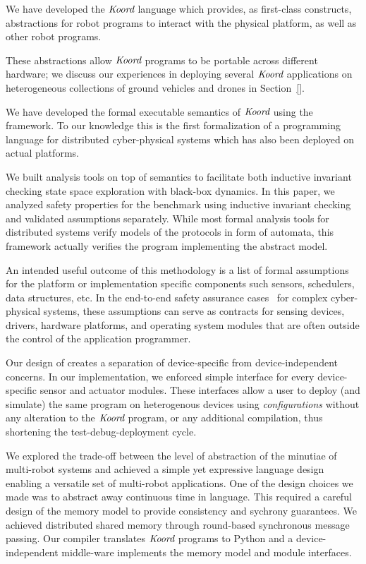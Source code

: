 \begin{noinditem}

\item  {We have developed the $\emph{Koord}$ language which provides, as first-class constructs,  abstractions for robot  programs to interact with the physical platform, as well as other robot programs.}
\item These abstractions allow $\emph{Koord}$ programs to be portable across different hardware; we  discuss our experiences in deploying several $\emph{Koord}$ applications on heterogeneous collections of ground vehicles and drones in Section~\ref{}.
\item  We have developed the formal executable semantics of $\emph{Koord}$ using the \K framework. To our knowledge this is the first formalization of a programming language for distributed cyber-physical systems which has also been deployed on actual platforms.
\item  We built analysis tools on top of semantics to facilitate both inductive invariant checking state space exploration with black-box dynamics. In this paper, we analyzed safety properties for the benchmark using inductive invariant checking and validated assumptions separately. While most formal analysis tools for distributed systems verify models of the protocols in form of automata, this framework actually verifies the program implementing the abstract model.
\item An intended useful outcome of this methodology is a list of formal assumptions for the platform or implementation specific components such sensors, schedulers, data structures, etc. In the end-to-end safety assurance cases~\cite{} for complex cyber-physical systems, these assumptions can serve as contracts for sensing devices, drivers, hardware platforms, and operating system modules that are often outside the control of the application programmer.
\item Our design of \lgname creates a separation of device-specific from device-independent concerns. In our implementation, we enforced simple interface for every device-specific sensor and actuator modules. These interfaces allow a user to deploy (and simulate) the same program on heterogenous devices using \emph{configurations} without any alteration to the $\emph{Koord}$ program, or any additional compilation, thus shortening the test-debug-deployment cycle.
\item We explored the trade-off between the level of abstraction of the minutiae of multi-robot systems and achieved a simple yet expressive language design enabling a versatile set of multi-robot applications. One of the design choices we made was to abstract away continuous time in language. This required a careful design of the memory model to provide consistency and sychrony guarantees. We achieved distributed shared memory through round-based synchronous message passing. Our compiler translates $\emph{Koord}$ programs to Python and a device-independent middle-ware implements the memory model and module interfaces.

\end{noinditem}
